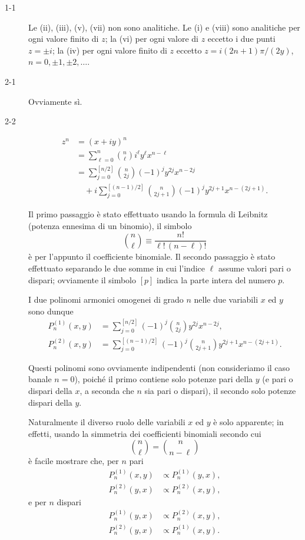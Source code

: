 \documentclass[11pt, a4paper]{book}
\numberwithin{equation}{section}
\begin{document}
\begin{description}
\item[1-1] Le (ii), (iii), (v), (vii) non sono analitiche. Le (i) e (viii) sono analitiche per ogni valore finito di $z$; la (vi) per ogni valore di $z$ eccetto i due punti $z = \pm i$; la (iv) per ogni valore finito di $z$ eccetto $z = i(2n+1)\pi/(2y)$, $n = 0, \pm 1, \pm 2, \ldots$.

\item[2-1] Ovviamente sì.

\item[2-2] 
\begin{align*}
z^n &= (x+iy)^n \\
&= \sum_{\ell=0}^{n} \binom{n}{\ell} i^\ell y^\ell x^{n-\ell} \\
&= \sum_{j=0}^{[n/2]} \binom{n}{2j}(-1)^j y^{2j} x^{n-2j} \\
&\quad + i \sum_{j=0}^{[(n-1)/2]} \binom{n}{2j+1}(-1)^j y^{2j+1} x^{n-(2j+1)}.
\end{align*}

Il primo passaggio è stato effettuato usando la formula di Leibnitz (potenza ennesima di un binomio), il simbolo
$$\binom{n}{\ell} \equiv \frac{n!}{\ell!\,(n-\ell)!}$$
è per l'appunto il coefficiente binomiale. Il secondo passaggio è stato effettuato separando le due somme in cui l'indice $\ell$ assume valori pari o dispari; ovviamente il simbolo $[p]$ indica la parte intera del numero $p$.

I due polinomi armonici omogenei di grado $n$ nelle due variabili $x$ ed $y$ sono dunque
\begin{align*}
P_n^{(1)}(x,y) &= \sum_{j=0}^{[n/2]} (-1)^j \binom{n}{2j} y^{2j} x^{n-2j}, \\
P_n^{(2)}(x,y) &= \sum_{j=0}^{[(n-1)/2]} (-1)^j \binom{n}{2j+1} y^{2j+1} x^{n-(2j+1)}.
\end{align*}

Questi polinomi sono ovviamente indipendenti (non consideriamo il caso banale $n=0$), poiché il primo contiene solo potenze pari della $y$ (e pari o dispari della $x$, a seconda che $n$ sia pari o dispari), il secondo solo potenze dispari della $y$.

Naturalmente il diverso ruolo delle variabili $x$ ed $y$ è solo apparente; in effetti, usando la simmetria dei coefficienti binomiali secondo cui
$$\binom{n}{\ell} = \binom{n}{n-\ell}$$
è facile mostrare che, per $n$ pari
\begin{align*}
P_n^{(1)}(x,y) &\propto P_n^{(1)}(y,x), \\
P_n^{(2)}(y,x) &\propto P_n^{(2)}(x,y),
\end{align*}
e per $n$ dispari
\begin{align*}
P_n^{(1)}(y,x) &\propto P_n^{(2)}(x,y), \\
P_n^{(2)}(y,x) &\propto P_n^{(1)}(x,y).
\end{align*}


\end{description}
\end{document}

